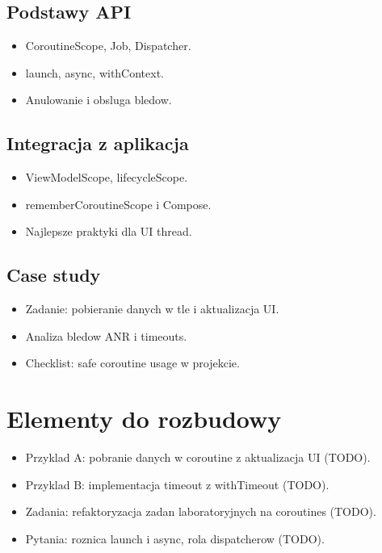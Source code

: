 \subsection{Podstawy API}
\begin{itemize}
  \item CoroutineScope, Job, Dispatcher.
  \item launch, async, withContext.
  \item Anulowanie i obsluga bledow.
\end{itemize}

\subsection{Integracja z aplikacja}
\begin{itemize}
  \item ViewModelScope, lifecycleScope.
  \item rememberCoroutineScope i Compose.
  \item Najlepsze praktyki dla UI thread.
\end{itemize}

\subsection{Case study}
\begin{itemize}
  \item Zadanie: pobieranie danych w tle i aktualizacja UI.
  \item Analiza bledow ANR i timeouts.
  \item Checklist: safe coroutine usage w projekcie.
\end{itemize}

\section{Elementy do rozbudowy}
\begin{itemize}
  \item Przyklad A: pobranie danych w coroutine z aktualizacja UI (TODO).
  \item Przyklad B: implementacja timeout z withTimeout (TODO).
  \item Zadania: refaktoryzacja zadan laboratoryjnych na coroutines (TODO).
  \item Pytania: roznica launch i async, rola dispatcherow (TODO).
\end{itemize}

